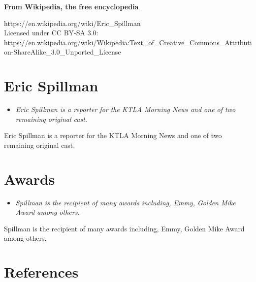 \textbf{From Wikipedia, the free encyclopedia}

https://en.wikipedia.org/wiki/Eric\_Spillman\\
Licensed under CC BY-SA 3.0:\\
https://en.wikipedia.org/wiki/Wikipedia:Text\_of\_Creative\_Commons\_Attribution-ShareAlike\_3.0\_Unported\_License

\section{Eric Spillman}\label{eric-spillman}

\begin{itemize}
\item
  \emph{Eric Spillman is a reporter for the KTLA Morning News and one of
  two remaining original cast.}
\end{itemize}

Eric Spillman is a reporter for the KTLA Morning News and one of two
remaining original cast.

\section{Awards}\label{awards}

\begin{itemize}
\item
  \emph{Spillman is the recipient of many awards including, Emmy, Golden
  Mike Award among others.}
\end{itemize}

Spillman is the recipient of many awards including, Emmy, Golden Mike
Award among others.

\section{References}\label{references}
